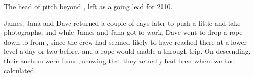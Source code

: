 \begin{marginfigure}
\checkoddpage \ifoddpage \forcerectofloat \else \forceversofloat \fi
\centering
 \caption{The head of \protect{} pitch beyond \protect{}, left as a going lead for 2010. }
 \label{below zimmer second pitch eggsplosive}
\end{marginfigure}

James, Jana and Dave returned a couple of days later to push a little
and take photographs, and while James and Jana got to work, Dave went to
drop a rope down to  from ,
since the  crew had seemed likely to have reached there at a
lower level a day or two before, and a rope would enable a through-trip. On descending, their anchors were found, showing that they actually had
been where we had calculated.

